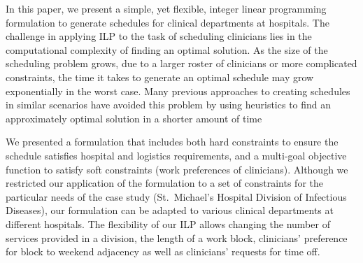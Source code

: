 In this paper, we present a simple, yet flexible, integer linear programming
formulation to generate schedules for clinical departments at hospitals.
The challenge in applying ILP to the task of scheduling clinicians lies in the
computational complexity of finding an optimal solution. As the size of the
scheduling problem grows, due to a larger roster of clinicians or more
complicated constraints, the time it takes to generate an optimal schedule may
grow exponentially in the worst case.
Many previous approaches to creating schedules in similar scenarios have avoided
this problem by using heuristics to find an approximately optimal solution 
in a shorter amount of time~\cite{burke_state_2004}


We presented a formulation that includes both hard constraints to ensure the
schedule satisfies hospital and logistics requirements, and a multi-goal
objective function to satisfy soft constraints (work preferences of clinicians).
Although we restricted our application of the formulation to a set of
constraints for the particular needs of the case study (St.\ Michael's Hospital
Division of Infectious Diseases), our formulation can be adapted to various
clinical departments at different hospitals. The flexibility of our ILP allows
changing the number of services provided in a division, the length of a work
block, clinicians' preference for block to weekend adjacency as well as
clinicians' requests for time off.


